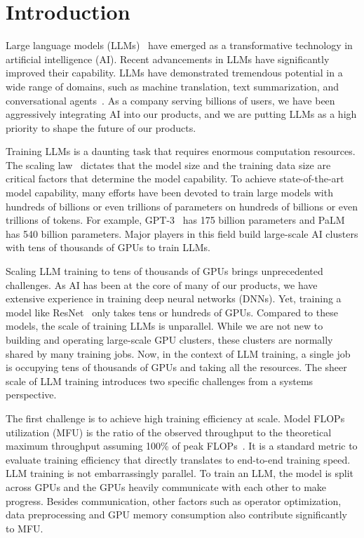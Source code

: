 \documentclass[letterpaper,twocolumn,10pt]{article}
\begin{document}
\section{Introduction}
\label{sec:introduction}

Large language models (LLMs)~\cite{brown2020language} have emerged as a transformative
technology in artificial intelligence (AI). Recent advancements in LLMs have
significantly improved their capability. LLMs have demonstrated tremendous
potential in a wide range of domains, such as machine translation, text
summarization, and conversational agents~\cite{chatgpt}. As a company serving billions
of users, we have been aggressively integrating AI into our products, and we are
putting LLMs as a high priority to shape the future of our products.

Training LLMs is a daunting task that requires enormous computation resources.
The scaling law~\cite{kaplan2020scaling} dictates that the model size and the
training data size are critical factors that determine the model capability. To
achieve state-of-the-art model capability, many efforts have been devoted to
train large models with hundreds of billions or even trillions of parameters on
hundreds of billions or even trillions of tokens. For example, GPT-3~\cite{floridi2020gpt}
has 175 billion parameters and PaLM~\cite{chowdhery2022palm} has 540 billion parameters. Major
players in this field build large-scale AI clusters with tens of thousands of
GPUs to train LLMs.

Scaling LLM training to tens of thousands of GPUs brings unprecedented
challenges. As AI has been at the core of many of our products, we have extensive
experience in training deep neural networks (DNNs). Yet, training a model like
ResNet~\cite{he2016deep} only takes tens or hundreds of GPUs.
Compared to these models,
the scale of training LLMs
is unparallel. While we are not new to building and operating
large-scale GPU clusters, these clusters are normally shared by many training
jobs. Now, in the context of LLM training, a single job is occupying tens of
thousands of GPUs and taking all the resources. The sheer scale of
LLM training introduces two specific challenges from a systems perspective.

The first challenge is to achieve high training efficiency at scale. Model FLOPs
utilization (MFU) is the ratio of the observed throughput to the theoretical
maximum throughput assuming 100\% of peak FLOPs~\cite{narayanan2021efficient}.
It is a standard metric to evaluate training efficiency that directly translates
to end-to-end training speed. LLM training is not embarrassingly parallel. To
train an LLM, the model is split across GPUs and the GPUs heavily communicate
with each other to make progress. Besides communication, other factors such as
operator optimization, data preprocessing and GPU memory consumption also
contribute significantly to MFU.
\end{document}
